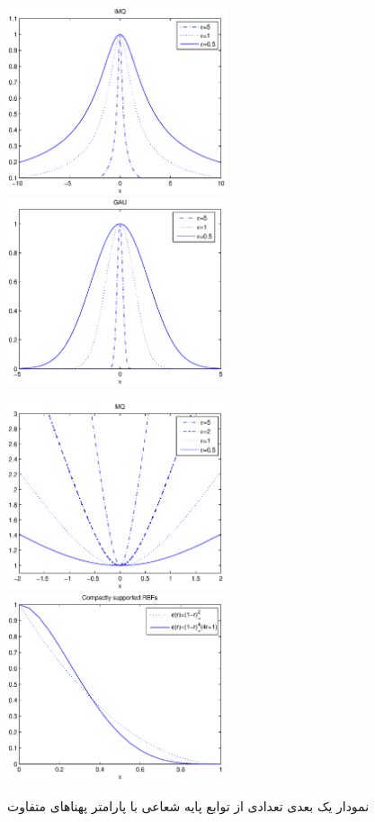 %
%
\begin{figure}
	\centerline{
		\includegraphics[height=5.5cm]{IMQ.eps}
		\includegraphics[height=5.5cm]{Gaussian.eps}}
	\centerline{
		\includegraphics[height=5.5cm]{MQ.eps}
		\includegraphics[height=5.5cm]{compact.eps}} 
	\caption{
		نمودار یک بعدی تعدادی از توابع پایه شعاعی با پارامتر پهناهای متفاوت}
	\label{fig:rbf}
\end{figure}
%


